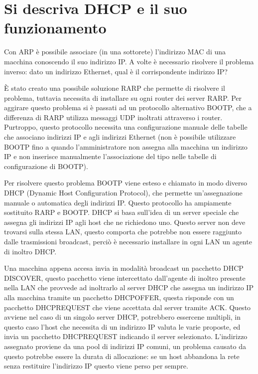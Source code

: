 \section{Si descriva DHCP e il suo funzionamento}

Con ARP è possibile associare (in una sottorete) l’indirizzo MAC di una macchina conoscendo il suo indirizzo IP.
A volte è necessario risolvere il problema inverso: dato un indirizzo Ethernet, qual è il corrispondente indirizzo IP?

È stato creato una possibile soluzione RARP che permette di risolvere il problema, tuttavia necessita di installare su ogni router dei server RARP. Per aggirare questo problema si è passati ad un protocollo alternativo BOOTP, che a differenza di RARP utilizza messaggi UDP inoltrati attraverso i router. Purtroppo, questo protocollo necessita una configurazione manuale delle tabelle che associano indirizzi IP e agli indirizzi Ethernet (non è possibile utilizzare BOOTP fino a quando l’amministratore non assegna alla macchina un indirizzo IP e non inserisce manualmente l’associazione del tipo nelle tabelle di configurazione di BOOTP).

Per risolvere questo problema BOOTP viene esteso e chiamato in modo diverso DHCP (Dynamic Host Configuration Protocol), che permette un’assegnazione manuale o automatica degli indirizzi IP.
Questo protocollo ha ampiamente sostituito RARP e BOOTP.
DHCP si basa sull’idea di un server speciale che assegna gli indirizzi IP agli host che ne richiedono uno.
Questo server non deve trovarsi sulla stessa LAN, questo comporta che potrebbe non essere raggiunto dalle trasmissioni broadcast, perciò è necessario installare in ogni LAN un agente di inoltro DHCP.

Una macchina appena accesa invia in modalità broadcast un pacchetto DHCP DISCOVER, questo pacchetto viene intercettato dall’agente di inoltro presente nella LAN che provvede ad inoltrarlo al server DHCP che assegna un indirizzo IP alla macchina tramite un pacchetto DHCPOFFER, questa risponde con un pacchetto DHCPREQUEST che viene accettata dal server tramite ACK.
Questo avviene nel caso di un singolo server DHCP, potrebbero essercene multipli, in questo caso l’host che necessita di un indirizzo IP valuta le varie proposte, ed invia un pacchetto DHCPREQUEST indicando il server selezionato.
L’indirizzo assegnato proviene da una pool di indirizzi IP comuni, un problema causato da questo potrebbe essere la durata di allocazione: se un host abbandona la rete senza restituire l’indirizzo IP questo viene perso per sempre.

